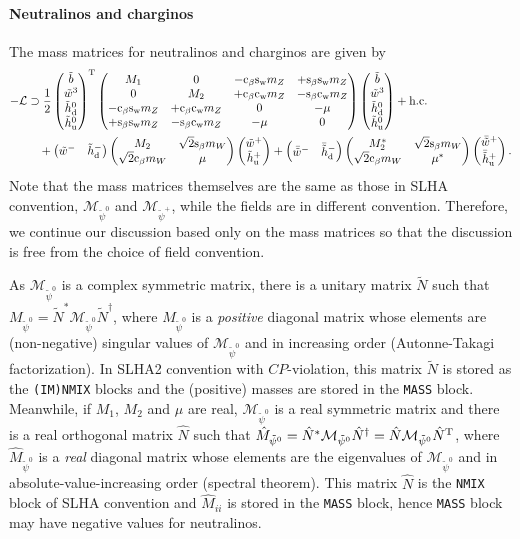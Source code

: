 \documentclass[CheatSheet]{subfiles}
\begin{document}
\paragraph{Neutralinos and charginos}
The mass matrices for neutralinos and charginos are given by
\begin{equation}
\begin{split}
  -\mathcal L&\supset
 \frac12\begin{pmatrix}\tilde b\\\tilde w^3\\\tilde h_{\mathrm{d}}^0\\\tilde h_{\mathrm{u}}^0\end{pmatrix}^{\mathrm{T}}
 \begin{pmatrix}
 M_1&0&-\mathrm{c}_{\beta}\mathrm{s}_{\mathrm w} m_Z&+\mathrm{s}_{\beta}\mathrm{s}_{\mathrm w} m_Z \\
 0&M_2&+\mathrm{c}_{\beta}\mathrm{c}_{\mathrm w} m_Z&-\mathrm{s}_{\beta}\mathrm{c}_{\mathrm w} m_Z \\
 -\mathrm{c}_{\beta}\mathrm{s}_{\mathrm w} m_Z&+\mathrm{c}_{\beta}\mathrm{c}_{\mathrm w} m_Z&0&-\mu \\
 +\mathrm{s}_{\beta}\mathrm{s}_{\mathrm w} m_Z&-\mathrm{s}_{\beta}\mathrm{c}_{\mathrm w} m_Z&-\mu&0
 \end{pmatrix}
 \begin{pmatrix}\tilde b\\\tilde w^3\\\tilde h_{\mathrm{d}}^0\\\tilde h_{\mathrm{u}}^0\end{pmatrix} + \text{h.c.}
\\&\quad
+\begin{pmatrix}\tilde w^- & \tilde h_{\mathrm{d}}^-\end{pmatrix}
\begin{pmatrix} M_2& \sqrt2\mathrm{s}_{\beta} m_W\\ \sqrt2\mathrm{c}_{\beta} m_W& \mu\end{pmatrix}
\begin{pmatrix}\tilde w^+ \\ \tilde h_{\mathrm{u}}^+\end{pmatrix}
+\begin{pmatrix}\bar{\tilde w}^- & \bar{\tilde h}_{\mathrm{d}}^-\end{pmatrix}
\begin{pmatrix} M_2^*& \sqrt2\mathrm{s}_{\beta} m_W\\ \sqrt2\mathrm{c}_{\beta} m_W& \mu^*\end{pmatrix}
\begin{pmatrix}\bar{\tilde w}^+ \\ \bar{\tilde h}_{\mathrm{u}}^+\end{pmatrix}.
\end{split}
\end{equation}
Note that the mass matrices themselves are the same as those in SLHA convention, $\mathcal M_{\tilde\psi^0}$ and $\mathcal M_{\tilde\psi^+}$, while the fields are in different convention.
Therefore, we continue our discussion based only on the mass matrices so that the discussion is free from the choice of field convention.

As $\mathcal M_{\tilde\psi^0}$ is a complex symmetric matrix, there is a unitary matrix $\tilde N$ such that
$M_{\tilde\psi^0}=\tilde N^* \mathcal M_{\tilde\psi^0}\tilde N^\dagger$, where $M_{\tilde\psi^0}$ is a \emph{positive} diagonal matrix whose elements are (non-negative) singular values of $\mathcal M_{\tilde\psi^0}$ and in increasing order (Autonne-Takagi factorization).
In SLHA2 convention with $CP$-violation, this matrix $\tilde N$ is stored as the \texttt{(IM)NMIX} blocks and the (positive) masses are stored in the \texttt{MASS} block.
Meanwhile, if $M_1$, $M_2$ and $\mu$ are real, $\mathcal M_{\tilde\psi^0}$ is a real symmetric matrix and there is a real orthogonal matrix $\hat N$ such that
$\hat M_{\tilde\psi^0}=\hat N^* \mathcal M_{\tilde\psi^0}\hat N^\dagger=\hat N \mathcal M_{\tilde\psi^0}\hat N^{\mathrm{T}}$, where $\hat M_{\tilde\psi^0}$ is a \emph{real} diagonal matrix whose elements are the eigenvalues of $\mathcal M_{\tilde\psi^0}$ and in absolute-value-increasing order (spectral theorem).
This matrix $\hat N$ is the \texttt{NMIX} block of SLHA convention and $\hat M_{ii}$ is stored in the \texttt{MASS} block, hence \texttt{MASS} block may have negative values for neutralinos.
\end{document}
